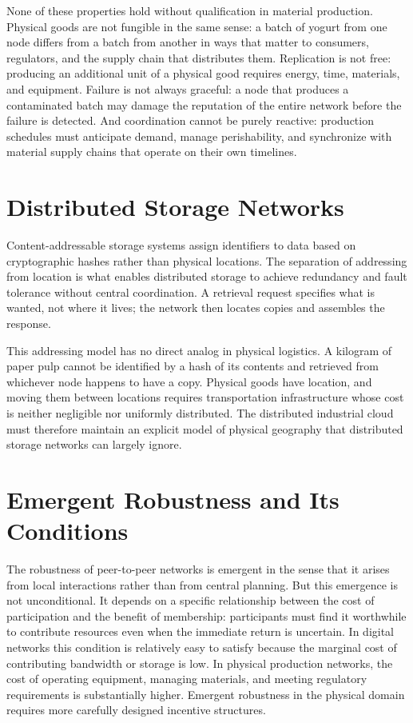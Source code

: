 \documentclass[12pt]{book}
\theoremstyle{definition}
\theoremstyle{remark}
\begin{document}
None of these properties hold without qualification in material
production. Physical goods are not fungible in the same sense: a
batch of yogurt from one node differs from a batch from another in
ways that matter to consumers, regulators, and the supply chain that
distributes them. Replication is not free: producing an additional
unit of a physical good requires energy, time, materials, and
equipment. Failure is not always graceful: a node that produces a
contaminated batch may damage the reputation of the entire network
before the failure is detected. And coordination cannot be purely
reactive: production schedules must anticipate demand, manage
perishability, and synchronize with material supply chains that
operate on their own timelines.

\section{Distributed Storage Networks}

Content-addressable storage systems assign identifiers to data based
on cryptographic hashes rather than physical locations. The
separation of addressing from location is what enables distributed
storage to achieve redundancy and fault tolerance without central
coordination. A retrieval request specifies what is wanted, not
where it lives; the network then locates copies and assembles the
response.

This addressing model has no direct analog in physical logistics.
A kilogram of paper pulp cannot be identified by a hash of its
contents and retrieved from whichever node happens to have a copy.
Physical goods have location, and moving them between locations
requires transportation infrastructure whose cost is neither
negligible nor uniformly distributed. The distributed industrial
cloud must therefore maintain an explicit model of physical geography
that distributed storage networks can largely ignore.

\section{Emergent Robustness and Its Conditions}

The robustness of peer-to-peer networks is emergent in the sense that
it arises from local interactions rather than from central planning.
But this emergence is not unconditional. It depends on a specific
relationship between the cost of participation and the benefit of
membership: participants must find it worthwhile to contribute
resources even when the immediate return is uncertain. In digital
networks this condition is relatively easy to satisfy because the
marginal cost of contributing bandwidth or storage is low. In
physical production networks, the cost of operating equipment,
managing materials, and meeting regulatory requirements is
substantially higher. Emergent robustness in the physical domain
requires more carefully designed incentive structures.
\end{document}
